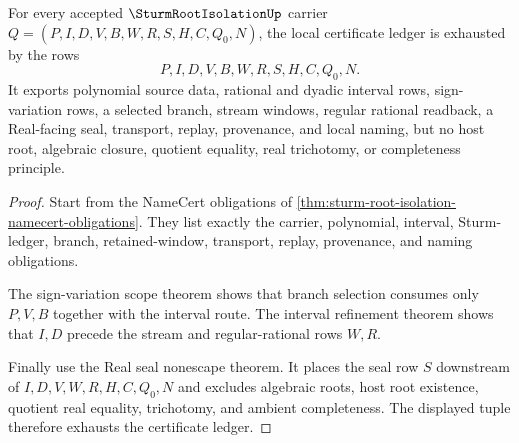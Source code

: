 \begin{theorem}
\label{thm:sturm-root-isolation-certificate-ledger}
For every accepted $\SturmRootIsolationUp$ carrier $Q=(P,I,D,V,B,W,R,S,H,C,Q_0,N)$, the local certificate ledger is exhausted by the rows
$$
P,I,D,V,B,W,R,S,H,C,Q_0,N .
$$
It exports polynomial source data, rational and dyadic interval rows, sign-variation rows, a selected branch, stream windows, regular rational readback, a Real-facing seal, transport, replay, provenance, and local naming, but no host root, algebraic closure, quotient equality, real trichotomy, or completeness principle.
\end{theorem}
\begin{proof}
Start from the NameCert obligations of \autoref{thm:sturm-root-isolation-namecert-obligations}. They list exactly the carrier, polynomial, interval, Sturm-ledger, branch, retained-window, transport, replay, provenance, and naming obligations.

The sign-variation scope theorem shows that branch selection consumes only $P,V,B$ together with the interval route. The interval refinement theorem shows that $I,D$ precede the stream and regular-rational rows $W,R$.

Finally use the Real seal nonescape theorem. It places the seal row $S$ downstream of $I,D,V,W,R,H,C,Q_0,N$ and excludes algebraic roots, host root existence, quotient real equality, trichotomy, and ambient completeness. The displayed tuple therefore exhausts the certificate ledger.
\end{proof}

